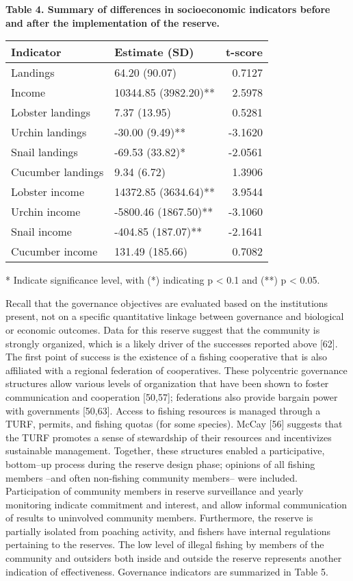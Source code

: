 \documentclass[12pt,]{article}
\begin{document}
\textbf{Table 4. Summary of differences in socioeconomic indicators
before and after the implementation of the reserve.}

\begin{table}[H]
\centering
\begin{tabular}{l|l|r}
\hline
\bfseries{Indicator} & \bfseries{Estimate (SD)} & \bfseries{t-score}\\
\hline
Landings & 64.20 (90.07) & 0.7127\\
\hline
Income & 10344.85 (3982.20)** & 2.5978\\
\hline
Lobster landings & 7.37 (13.95) & 0.5281\\
\hline
Urchin landings & -30.00 (9.49)** & -3.1620\\
\hline
Snail landings & -69.53 (33.82)* & -2.0561\\
\hline
Cucumber landings & 9.34 (6.72) & 1.3906\\
\hline
Lobster income & 14372.85 (3634.64)** & 3.9544\\
\hline
Urchin income & -5800.46 (1867.50)** & -3.1060\\
\hline
Snail income & -404.85 (187.07)** & -2.1641\\
\hline
Cucumber income & 131.49 (185.66) & 0.7082\\
\hline
\end{tabular}
\end{table}

* Indicate significance level, with (*) indicating p \textless{} 0.1 and
(**) p \textless{} 0.05.

Recall that the governance objectives are evaluated based on the
institutions present, not on a specific quantitative linkage between
governance and biological or economic outcomes. Data for this reserve
suggest that the community is strongly organized, which is a likely
driver of the successes reported above {[}62{]}. The first point of
success is the existence of a fishing cooperative that is also
affiliated with a regional federation of cooperatives. These polycentric
governance structures allow various levels of organization that have
been shown to foster communication and cooperation {[}50,57{]};
federations also provide bargain power with governments {[}50,63{]}.
Access to fishing resources is managed through a TURF, permits, and
fishing quotas (for some species). McCay {[}56{]} suggests that the TURF
promotes a sense of stewardship of their resources and incentivizes
sustainable management. Together, these structures enabled a
participative, bottom--up process during the reserve design phase;
opinions of all fishing members --and often non-fishing community
members-- were included. Participation of community members in reserve
surveillance and yearly monitoring indicate commitment and interest, and
allow informal communication of results to uninvolved community members.
Furthermore, the reserve is partially isolated from poaching activity,
and fishers have internal regulations pertaining to the reserves. The
low level of illegal fishing by members of the community and outsiders
both inside and outside the reserve represents another indication of
effectiveness. Governance indicators are summarized in Table 5.
\end{document}
